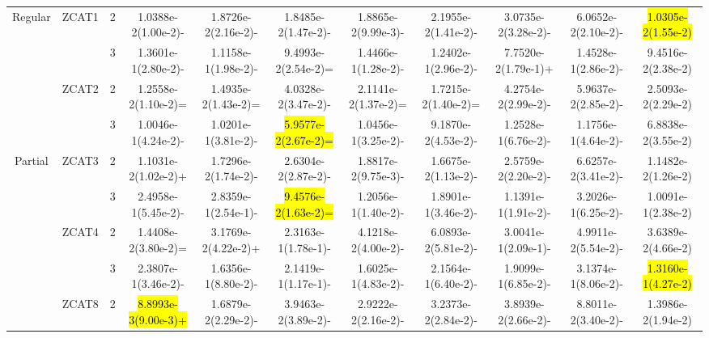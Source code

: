 \documentclass[a4paper,fleqn]{cas-dc}
\newcommand{\highlight}[1]{
	\begingroup
	\sethlcolor{Seashell}%
	\hl{#1}%
	\endgroup
}
\begin{document}
\begin{sloppypar}
\begin{table}[ht]
{\begin{tabular}{ccccccccccc}
					\multirow{4}{*}{Regular}&\multirow{2}{*}{ZCAT1}&2	&1.0388e-2(1.00e-2)-	&1.8726e-2(2.16e-2)-	&1.8485e-2(1.47e-2)-	&1.8865e-2(9.99e-3)-	&2.1955e-2(1.41e-2)-	&3.0735e-2(3.28e-2)-	&6.0652e-2(2.10e-2)-	&\highlight{1.0305e-2(1.55e-2)}\\
					
					\multirow{4}{*}{~}&\multirow{2}{*}{~}&3&1.3601e-1(2.80e-2)-	&1.1158e-1(1.98e-2)-	&9.4993e-2(2.54e-2)=	&1.4466e-1(1.28e-2)-	&1.2402e-1(2.96e-2)-	&7.7520e-2(1.79e-1)+	&1.4528e-1(2.86e-2)-	&9.4516e-2(2.38e-2)\\
					
					
					
					\multirow{4}{*}{~}&\multirow{2}{*}{ZCAT2}&2&1.2558e-2(1.10e-2)=		&1.4935e-2(1.43e-2)=	&4.0328e-2(3.47e-2)-	&2.1141e-2(1.37e-2)=	&1.7215e-2(1.40e-2)=	&4.2754e-2(2.99e-2)-	&5.9637e-2(2.85e-2)-	&2.5093e-2(2.29e-2)\\
					
					\multirow{4}{*}{~}&\multirow{2}{*}{~}&3&1.0046e-1(4.24e-2)-		&1.0201e-1(3.81e-2)-	&\highlight{5.9577e-2(2.67e-2)=}	&1.0456e-1(3.25e-2)-	&9.1870e-2(4.53e-2)-	&1.2528e-1(6.76e-2)-	&1.1756e-1(4.64e-2)-	&6.8838e-2(3.55e-2)\\
					\hline
					
					
					
					\multirow{8}{*}{Partial}&\multirow{2}{*}{ZCAT3}&2&1.1031e-2(1.02e-2)+		&1.7296e-2(1.74e-2)-	&2.6304e-2(2.87e-2)-	&1.8817e-2(9.75e-3)-	&1.6675e-2(1.13e-2)-	&2.5759e-2(2.20e-2)-	&6.6257e-2(3.41e-2)-	&1.1482e-2(1.26e-2)\\
					
					\multirow{8}{*}{~}&\multirow{2}{*}{~}&3&2.4958e-1(5.45e-2)-	&2.8359e-1(2.54e-1)-	&\highlight{9.4576e-2(1.63e-2)=}	&1.2056e-1(1.40e-2)-	&1.8901e-1(3.46e-2)-	&1.1391e-1(1.91e-2)-	&3.2026e-1(6.25e-2)-	&1.0091e-1(2.38e-2)\\
					
					\multirow{8}{*}{~}&\multirow{2}{*}{ZCAT4}&2 &1.4408e-2(3.80e-2)=		&3.1769e-2(4.22e-2)+	&2.3163e-1(1.78e-1)-	&4.1218e-2(4.00e-2)-	&6.0893e-2(5.81e-2)-	&3.0041e-1(2.09e-1)-	&4.9911e-2(5.54e-2)-	&3.6389e-2(4.66e-2)\\
					
					
					\multirow{8}{*}{~}&\multirow{2}{*}{~}&3 &2.3807e-1(3.46e-2)-		&1.6356e-1(8.80e-2)-	&2.1419e-1(1.17e-1)-	&1.6025e-1(4.83e-2)-	&2.1564e-1(6.40e-2)-	&1.9099e-1(6.85e-2)-	&3.1374e-1(8.06e-2)-	&\highlight{1.3160e-1(4.27e-2)}\\
					
					
					\multirow{8}{*}{~}&\multirow{2}{*}{ZCAT8}&2  &\highlight{8.8993e-3(9.00e-3)+}		&1.6879e-2(2.29e-2)-	&3.9463e-2(3.89e-2)-	&2.9222e-2(2.16e-2)-	&3.2373e-2(2.84e-2)-	&3.8939e-2(2.66e-2)-	&8.8011e-2(3.40e-2)-	&1.3986e-2(1.94e-2)\\
					

\end{tabular}}
\end{table}
\end{sloppypar}
\end{document}
